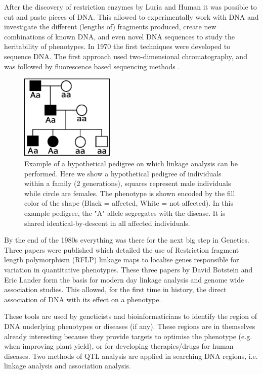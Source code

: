 After the discovery of restriction enzymes by Luria and Human \cite{Luria:1952} it was possible to cut and paste pieces 
of DNA. This allowed to experimentally work with DNA and investigate the different (lengths of) fragments produced, 
create new combinations of known DNA, and even novel DNA sequences to study the heritability of phenotypes. In 1970 
the first techniques were developed to sequence DNA. The first approach used two-dimensional chromatography, and was 
followed by fluorescence based sequencing methods \cite{Pettersson:2009}.

\begin{figure}
  \centering
  \includegraphics[width=0.4\textwidth]{eps/image_1_2.eps}
  \caption[Example of pedigree based linkage analysis.]
    {Example of a hypothetical pedigree on which linkage analysis can be performed. Here we show a 
    hypothetical pedigree of individuals within a family (2 generations), squares represent 
    male individuals while circle are females. The phenotype is shown encoded by the fill 
    color of the shape (Black = affected, White = not affected).  In this example pedigree, 
    the "A" allele segregates with the disease. It is shared identical-by-descent in all 
    affected individuals. }
    \label{fig:pedigree}
\end{figure}

By the end of the 1980s everything was there for the next big step in Genetics. Three papers were published which detailed 
the use of Restriction fragment length polymorphism (RFLP) linkage maps to localise genes responsible for variation in 
quantitative phenotypes. These three papers by David Botstein and Eric Lander \cite{Lander:1986, Lander:1987, Lander:1989} 
form the basis for modern day linkage analysis and genome wide association studies. This allowed, for the first time in 
history, the direct association of DNA with its effect on a phenotype. 

These tools are used by geneticists and bioinformaticians to identify the region of DNA underlying phenotypes or diseases 
(if any). These regions are in themselves already interesting because they provide targets to optimise the phenotype (e.g. 
when improving plant yield), or for developing therapies/drugs for human diseases. Two methods of QTL analysis are applied 
in searching  DNA regions, i.e. linkage analysis and association analysis. 

